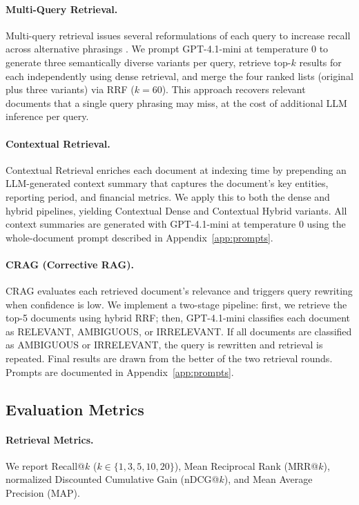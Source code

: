 \documentclass[11pt]{article}
\begin{document}
\paragraph{Multi-Query Retrieval.}
Multi-query retrieval issues several reformulations of each query to increase recall across alternative phrasings \citep{raudaschl2023ragfusion}. We prompt GPT-4.1-mini at temperature 0 to generate three semantically diverse variants per query, retrieve top-$k$ results for each independently using dense retrieval, and merge the four ranked lists (original plus three variants) via RRF ($k = 60$). This approach recovers relevant documents that a single query phrasing may miss, at the cost of additional LLM inference per query.

\paragraph{Contextual Retrieval.}
Contextual Retrieval \citep{anthropic2024contextual} enriches each document at indexing time by prepending an LLM-generated context summary that captures the document's key entities, reporting period, and financial metrics. We apply this to both the dense and hybrid pipelines, yielding Contextual Dense and Contextual Hybrid variants. All context summaries are generated with GPT-4.1-mini at temperature 0 using the whole-document prompt described in Appendix~\ref{app:prompts}.

\paragraph{CRAG (Corrective RAG).}
CRAG \citep{yan2024crag} evaluates each retrieved document's relevance and triggers query rewriting when confidence is low. We implement a two-stage pipeline: first, we retrieve the top-5 documents using hybrid RRF; then, GPT-4.1-mini classifies each document as RELEVANT, AMBIGUOUS, or IRRELEVANT. If all documents are classified as AMBIGUOUS or IRRELEVANT, the query is rewritten and retrieval is repeated. Final results are drawn from the better of the two retrieval rounds. Prompts are documented in Appendix~\ref{app:prompts}.

\subsection{Evaluation Metrics}
\label{sec:metrics}

\paragraph{Retrieval Metrics.}
We report Recall@$k$ ($k \in \{1, 3, 5, 10, 20\}$), Mean Reciprocal Rank (MRR@$k$), normalized Discounted Cumulative Gain (nDCG@$k$), and Mean Average Precision (MAP).
\end{document}
